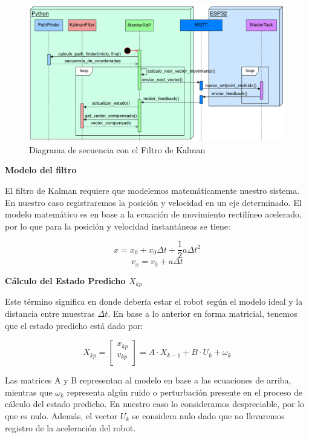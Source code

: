 \begin{figure}[H]
    \centering
    \includegraphics[width=1.1\linewidth]{images/diag_secuencia_filtro_de_kalman_con_esp32.png}
    \caption{Diagrama de secuencia con el Filtro de Kalman}
    \label{fig:diagsecuenciafiltrokalman}
\end{figure}


\textbf{Modelo del filtro} \mbox{} \vspace{8pt}

El filtro de Kalman requiere que modelemos matemáticamente nuestro sistema. En nuestro caso registraremos la posición y velocidad en un eje determinado. El modelo matemático es en base a la ecuación de movimiento rectilíneo acelerado, por lo que para la posición y velocidad instantáneas se tiene:

$$ x = x_0 + x_0 \Delta t + \frac{1}{2} a \Delta t^2 $$
$$ v_x = v_0 + a\Delta t $$

\textbf{Cálculo del Estado Predicho $X_{kp}$} \mbox{} \vspace{8pt}

Este término significa en donde debería estar el robot según el modelo ideal y la distancia entre muestras $\Delta t$. En base a lo anterior en forma matricial, tenemos que el estado predicho está dado por:

$$ X_{kp} =
    \begin{bmatrix} x_{kp} \\ v_{kp} \\ \end{bmatrix}
    =
    A \cdot X_{k-1} + B \cdot U_k + \omega_k
$$

Las matrices A y B representan al modelo en base a las ecuaciones de arriba, mientras que $\omega_k$ representa algún ruido o perturbación presente en el proceso de cálculo del estado predicho. En nuestro caso lo consideramos despreciable, por lo que es nulo. Además, el vector $U_k$ se considera nulo dado que no llevaremos registro de la aceleración del robot.


